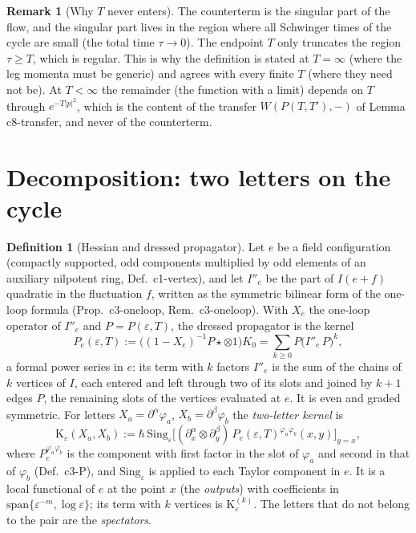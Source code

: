 \documentclass[11pt]{article}
\numberwithin{equation}{section}
\theoremstyle{plain}
\theoremstyle{definition}
\newtheorem{definition}[theorem]{Definition}
\newtheorem{remark}[theorem]{Remark}
\begin{document}
\begin{remark}[Why $T$ never enters]
The counterterm is the singular part of the flow, and the singular part lives in the region where all Schwinger times of the cycle are small (the total time $\tau\to0$). The endpoint $T$ only truncates the region $\tau\ge T$, which is regular. This is why the definition is stated at $T=\infty$ (where the leg momenta must be generic) and agrees with every finite $T$ (where they need not be). At $T<\infty$ the remainder (the function with a limit) depends on $T$ through $e^{-T|p|^2}$, which is the content of the transfer $W(P(T,T'),-)$ of Lemma c8-transfer, and never of the counterterm.
\end{remark}


\section{Decomposition: two letters on the cycle}
\label{sec:tl-decomp}

\begin{definition}[Hessian and dressed propagator]
\label{def:tl-dressed}
Let $e$ be a field configuration (compactly supported, odd components multiplied by odd elements of an auxiliary nilpotent ring, Def.~c1-vertex), and let $I''_e$ be the part of $I(e+f)$ quadratic in the fluctuation $f$, written as the symmetric bilinear form of the one-loop formula (Prop.~c3-oneloop, Rem.~c3-oneloop). With $X_e$ the one-loop operator of $I''_e$ and $P=P(\varepsilon,T)$, the dressed propagator is the kernel
\[
P_e(\varepsilon,T):=\big((1-X_e)^{-1}P\star\otimes1\big)K_0=\sum_{k\ge0}P\big(I''_e\,P\big)^k ,
\]
a formal power series in $e$: its term with $k$ factors $I''_e$ is the sum of the chains of $k$ vertices of $I$, each entered and left through two of its slots and joined by $k+1$ edges $P$, the remaining slots of the vertices evaluated at $e$. It is even and graded symmetric. For letters $X_a=\partial^\alpha\varphi_a$, $X_b=\partial^\beta\varphi_b$ the \emph{two-letter kernel} is
\begin{equation}
\mathrm K_\varepsilon(X_a,X_b):=\hbar\,\mathrm{Sing}_\varepsilon\Big[(\partial^\alpha_x\otimes\partial^\beta_y)\,P_e(\varepsilon,T)^{\varphi_a\varphi_b}(x,y)\Big]_{y=x},
\label{eq:tl-kernel}
\end{equation}
where $P_e^{\varphi_a\varphi_b}$ is the component with first factor in the slot of $\varphi_a$ and second in that of $\varphi_b$ (Def.~c3-P), and $\mathrm{Sing}_\varepsilon$ is applied to each Taylor component in $e$. It is a local functional of $e$ at the point $x$ (the \emph{outputs}) with coefficients in $\mathrm{span}\{\varepsilon^{-m},\log\varepsilon\}$; its term with $k$ vertices is $\mathrm K^{(k)}_\varepsilon$. The letters that do not belong to the pair are the \emph{spectators}.
\end{definition}
\end{document}
